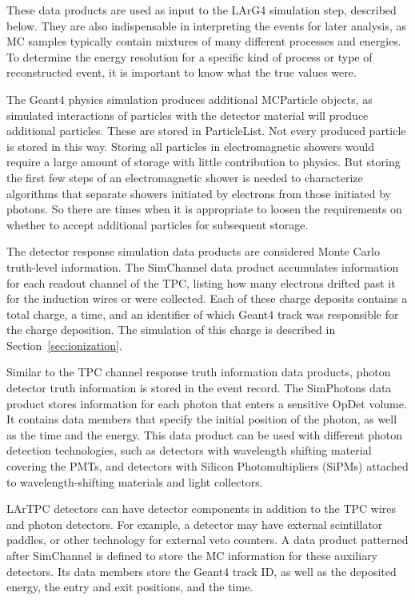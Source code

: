 \documentclass[12pt]{elsarticle}
\begin{document}
These data products are used as input to the LArG4 simulation step, described below. They are also indispensable in interpreting the events for later analysis, as MC samples typically contain mixtures of many different processes and energies. To determine the energy resolution for a specific kind of process or type of reconstructed event, it is important to know what the true values were.

The Geant4 physics simulation produces additional MCParticle objects, as simulated interactions
of particles with the detector material will produce additional particles.  These are stored in ParticleList.  Not every produced particle is stored in this way. Storing all 
particles in electromagnetic showers would require a large amount of storage with little contribution to physics. 
But storing the first few steps of an electromagnetic shower
is needed to characterize algorithms that separate showers initiated by electrons from those initiated by photons. So there are times when it is appropriate to loosen
the requirements on whether to accept additional particles for subsequent storage.

The detector response simulation data products are considered Monte Carlo truth-level information. The SimChannel data product accumulates information for each readout channel of the TPC, listing how many electrons drifted past it for the induction wires or were collected. Each of these charge deposits contains a total charge, a time, and an identifier of which Geant4 track was responsible for the charge deposition. The simulation of this charge is described in 
Section~\ref{sec:ionization}.

Similar to the TPC channel response truth information data products, photon detector truth information
is stored in the event record.  The SimPhotons data product stores information for each photon
that enters a sensitive OpDet volume.  It contains data members that specify the initial position of the
photon, as well as the time and the energy.    
This data product can be used with different photon detection technologies, such as detectors with wavelength shifting material covering the PMTs, and detectors with Silicon Photomultipliers (SiPMs) attached to wavelength-shifting materials and light collectors.

LArTPC detectors can have detector components in addition to the TPC wires and photon detectors.
For example, a detector may have external scintillator paddles, or other technology for external veto
counters.   A data product patterned after SimChannel is defined to store the MC information
for these auxiliary detectors.  Its data members store the Geant4 track ID, as well as the deposited energy, the entry and exit positions, and the time.
\end{document}
